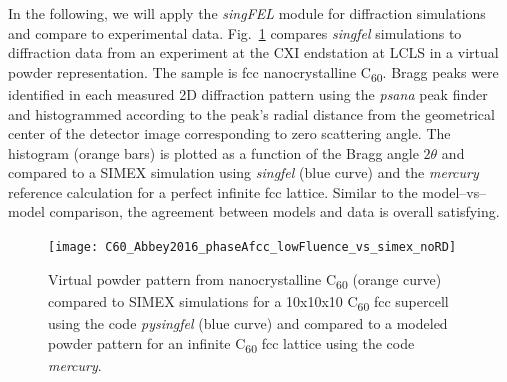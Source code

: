 \documentclass[10pt]{scrartcl}
\begin{document}
In the following, we will
apply the \textit{singFEL} module for diffraction simulations and compare to
experimental data.
Fig.~\ref{fig:C60_virtual_powder_data_vs_models} compares \textit{singfel}
simulations to diffraction data from
an experiment at the CXI endstation at LCLS in a virtual powder representation.
The sample is fcc nanocrystalline C\textsubscript{60}. Bragg peaks were identified in each measured
2D diffraction pattern using the \textit{psana} \cite{psana_www} peak finder
and histogrammed according to the peak's
radial distance from the geometrical center of the detector image corresponding
to zero scattering angle.
The histogram (orange bars) is plotted as a function of the Bragg
angle $2\theta$ and compared to a SIMEX simulation using \textit{singfel}
(blue curve) and the \textit{mercury} reference calculation for a perfect
infinite fcc lattice. Similar to the model--vs--model comparison, the agreement
between models and data is overall satisfying.
%
\begin{figure}[ht]
  \begin{center}
    \texttt{[image: C60\_Abbey2016\_phaseAfcc\_lowFluence\_vs\_simex\_noRD]}
    \caption{Virtual powder pattern from nanocrystalline C\textsubscript{60}
    \cite{Abbey2016} (orange curve) compared to SIMEX
    simulations for a 10x10x10 C\textsubscript{60} fcc supercell using the code
    \textit{pysingfel} (blue curve) and compared to a modeled powder pattern for
    an infinite C\textsubscript{60} fcc lattice using the code \textit{mercury}.}
    \label{fig:C60_virtual_powder_data_vs_models}
  \end{center}
\end{figure}
%
\end{document}
